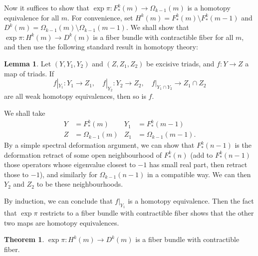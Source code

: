 \documentclass{shortart}
\theoremstyle{definition}
\newtheorem*{thm}{Theorem}
\newtheorem*{lemma}{Lemma}
\begin{document}
Now it suffices to show that $\exp \pi: F^k_*(m) \to \Omega_{k - 1}(m)$ is a homotopy equivalence for all $m$. For convenience, set $H^k(m) = F^k_*(m) \setminus F^k_*(m - 1)$ and $D^k(m) = \Omega_{k - 1}(m) \setminus \Omega_{k - 1}(m - 1)$. We shall show that $\exp \pi: H^k(m) \to D^k(m)$ is a fiber bundle with contractible fiber for all $m$, and then use the following standard result in homotopy theory:
\begin{lemma}
  Let $(Y, Y_1, Y_2)$ and $(Z, Z_1, Z_2)$ be excisive triads, and $f: Y \to Z$ a map of triads. If
  \[
    f|_{Y_1}: Y_1 \to Z_1,\quad f|_{Y_2}: Y_2 \to Z_2,\quad f|_{Y_1 \cap Y_2} \to Z_1 \cap Z_2
  \]
  are all weak homotopy equivalences, then so is $f$.\fakeqed
\end{lemma}

We shall take
\begin{align*}
  Y &= F^k_*(m) & Y_1 &= F^k_*(m - 1)\\
  Z &= \Omega_{k - 1}(m) & Z_1 &= \Omega_{k - 1}(m - 1).
\end{align*}
By a simple spectral deformation argument, we can show that $F^k_*(n - 1)$ is the deformation retract of some open neighbourhood of $F_*^k(n)$ (add to $F_*^k(n - 1)$ those operators whose eigenvalue closest to $-1$ has small real part, then retract those to $-1$), and similarly for $\Omega_{k - 1}(n - 1)$ in a compatible way. We can then $Y_2$ and $Z_2$ to be these neighbourhoods.

By induction, we can conclude that $f|_{Y_1}$ is a homotopy equivalence. Then the fact that $\exp \pi$ restricts to a fiber bundle with contractible fiber shows that the other two maps are homotopy equivalences. 

\begin{thm}
  $\exp \pi: H^k(m) \to D^k(m)$ is a fiber bundle with contractible fiber.
\end{thm}
\end{document}
